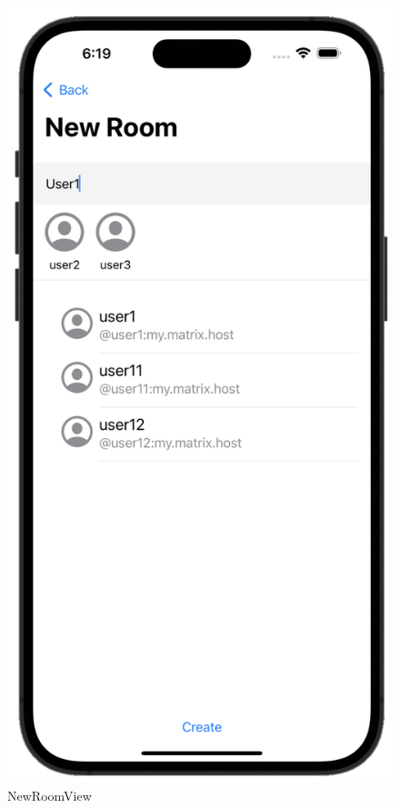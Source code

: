     \begin{figure}[h]
        \includegraphics[scale=0.5]{newroom_white}
        \centering
        \caption{NewRoomView}\label{fig:newroomview}
    \end{figure}

